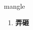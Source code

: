 
\begin{frame}
{\huge mangle}
\begin{center}
\begin{enumerate}\Large
  \item \textbf{弄砸}
\end{enumerate}
\end{center}
\end{frame}
